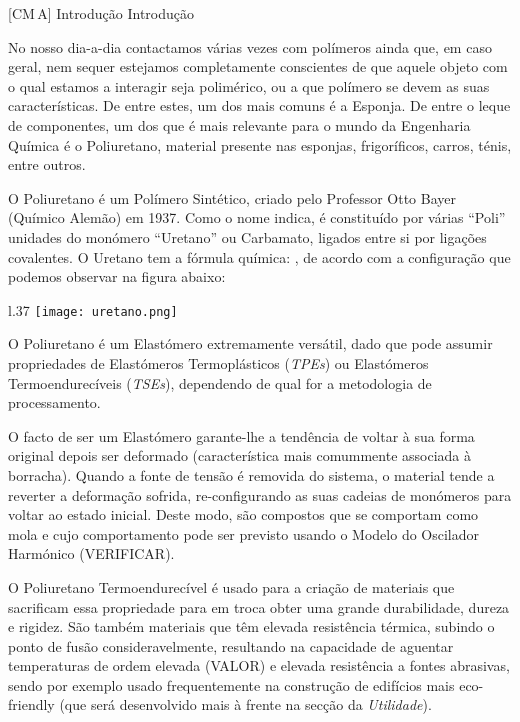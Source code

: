 \documentclass[\mainfilename]{subfiles}
\begin{document}
\graphicspath{{\subfix{./.build/figures/CM_A-Trabalho.1}}}

[CM\,A]
{Introdução} %
{Introdução} %

No nosso dia-a-dia contactamos várias vezes com polímeros ainda que, em caso geral, nem sequer estejamos completamente conscientes de que aquele objeto com o qual estamos a interagir seja polimérico, ou a que polímero se devem as suas características. De entre estes, um dos mais comuns é a Esponja. De entre o leque de componentes, um dos que é mais relevante para o mundo da Engenharia Química é o Poliuretano, material presente nas esponjas, frigoríficos, carros, ténis, entre outros.\par

O Poliuretano é um Polímero Sintético, criado pelo Professor Otto Bayer (Químico Alemão) em 1937. Como o nome indica, é constituído por várias ``Poli'' unidades do monómero ``Uretano'' ou Carbamato, ligados entre si por ligações covalentes. O Uretano tem a fórmula química: , de acordo com a configuração que podemos observar na figura abaixo:\par

\begin{wrapfigure}{l}{.37\textwidth}
    \texttt{[image: uretano.png]}
\end{wrapfigure}
O Poliuretano é um Elastómero extremamente versátil, dado que pode assumir propriedades de Elastómeros Termoplásticos (\textit{TPEs}) ou Elastómeros Termoendurecíveis (\textit{TSEs}), dependendo de qual for a metodologia de processamento.\par

O facto de ser um Elastómero garante-lhe a tendência de voltar à sua forma original depois ser deformado (característica mais comummente associada à borracha). Quando a fonte de tensão é removida do sistema, o material tende a reverter a deformação sofrida, re-configurando as suas cadeias de monómeros para voltar ao estado inicial. Deste modo, são compostos que se comportam como mola e cujo comportamento pode ser previsto usando o Modelo do Oscilador Harmónico (VERIFICAR).\par

O Poliuretano Termoendurecível é usado para a criação de materiais que sacrificam essa propriedade para em troca obter uma grande durabilidade, dureza e rigidez. São também materiais que têm elevada resistência térmica, subindo o ponto de fusão consideravelmente, resultando na capacidade de aguentar temperaturas de ordem elevada (VALOR) e elevada resistência a fontes abrasivas, sendo por exemplo usado frequentemente na construção de edifícios mais eco-friendly (que será desenvolvido mais à frente na secção da \emph{Utilidade}).\par
\end{document}
